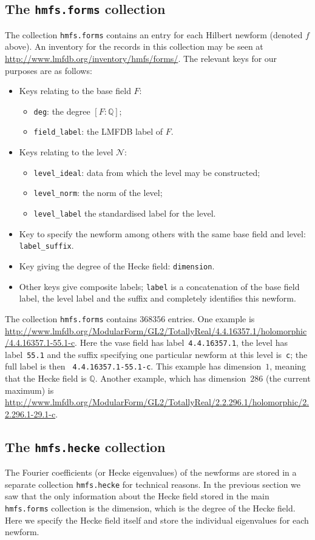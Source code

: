 \documentclass{llncs}
\def\Q{{\mathbb Q}}
\def\N{{\mathcal{N}}}
\begin{document}
\subsection{The {\tt hmfs.forms} collection}
The collection {\tt hmfs.forms} contains an entry for each Hilbert
newform (denoted $f$ above).  An inventory for the records in this
collection may be seen at
\url{http://www.lmfdb.org/inventory/hmfs/forms/}.  The relevant keys
for our purposes are as follows:
\begin{itemize}
\item Keys relating to the base field $F$:
\begin{itemize}
\item {\tt deg}:  the degree $[F:\Q]$;
  \item  {\tt field\_label}:  the LMFDB label of $F$.
\end{itemize}
\item Keys relating to the level  $\N$:
\begin{itemize}
\item {\tt level\_ideal}:  data from which the level may be
  constructed;
  \item {\tt level\_norm}: the norm of the level;
\item {\tt level\_label} the standardised label for the level.
\end{itemize}
\item Key to specify the newform among others with the same base field
  and level: {\tt label\_suffix}.
\item Key giving the degree of the Hecke field: {\tt dimension}.
\item Other keys give composite labels; {\tt label} is a concatenation
  of the base field label, the level label and the suffix and
  completely identifies this newform.
\end{itemize}

The collection {\tt hmfs.forms} contains $368356$ entries.  One
example is
\url{http://www.lmfdb.org/ModularForm/GL2/TotallyReal/4.4.16357.1/holomorphic/4.4.16357.1-55.1-c}.
Here the vase field has label~{\tt 4.4.16357.1}, the level has
label~{\tt 55.1} and the suffix specifying one particular newform at
this level is~{\tt c}; the full label is then {\tt
  4.4.16357.1-55.1-c}.  This example has dimension~$1$, meaning that
the Hecke field is $\Q$.  Another example, which has dimension~$286$
(the current maximum) is
\url{http://www.lmfdb.org/ModularForm/GL2/TotallyReal/2.2.296.1/holomorphic/2.2.296.1-29.1-c}.

\subsection{The {\tt hmfs.hecke} collection}
The Fourier coefficients (or Hecke eigenvalues) of the newforms are
stored in a separate collection {\tt hmfs.hecke} for technical
reasons.  In the previous section we saw that the only information
about the Hecke field stored in the main {\tt hmfs.forms} collection
is the dimension, which is the degree of the Hecke field.  Here we
specify the Hecke field itself and store the individual eigenvalues
for each newform.
\end{document}
